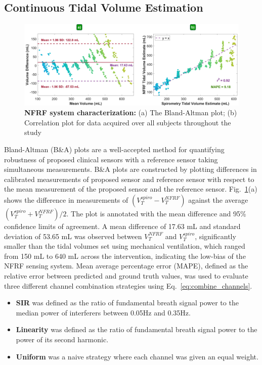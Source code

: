 \documentclass[journal,twoside,web]{ieeecolor}
\begin{document}
\subsection{Continuous Tidal Volume Estimation} \label{sec: tidal_vol_estimation}
\begin{figure}[t]
\centering
\includegraphics[width=.98\textwidth]{results_v3.jpg}
\caption{\textbf{NFRF system characterization:} (a) The Bland-Altman plot; (b) Correlation plot for data acquired over all subjects throughout the study}
\label{fig:results}
\end{figure}
Bland-Altman (B\&A) plots \cite{martinblandSTATISTICALMETHODSASSESSING1986}\cite{blandComparingMethodsMeasurement1995} are a well-accepted method for quantifying robustness of proposed clinical sensors with a reference sensor taking simultaneous measurements. B\&A plots are constructed by plotting differences in calibrated measurements of proposed sensor and reference sensor with respect to the mean measurement of the proposed sensor and the reference sensor. Fig.~\ref{fig:results}(a) shows the difference in measurements of $(V^{spiro}_T - V^{NFRF}_T)$ against the average $(V^{spiro}_T + V^{NFRF}_T)/2$. The plot is annotated with the mean difference and 95\% confidence limits of agreement. A mean difference of 17.63 mL and standard deviation of 53.65 mL was observed between $V^{NFRF}_T$ and $V^{spiro}_T$, significantly smaller than the tidal volumes set using mechanical ventilation, which ranged from 150 mL to 640 mL across the intervention, indicating the low-bias of the NFRF sensing system. Mean average percentage error (MAPE), defined as the relative error between predicted and ground truth values, was used to evaluate three different channel combination strategies using Eq.~\ref{eq:combine_channels}.
\begin{itemize}
    \item \textbf{SIR} was defined as the ratio of fundamental breath signal power to the median power of interferers between 0.05Hz and 0.35Hz. 
    \item \textbf{Linearity} was defined as the ratio of fundamental breath signal power to the power of its second harmonic. 
    \item \textbf{Uniform} was a naive strategy where each channel was given an equal weight.
\end{itemize}
\end{document}
